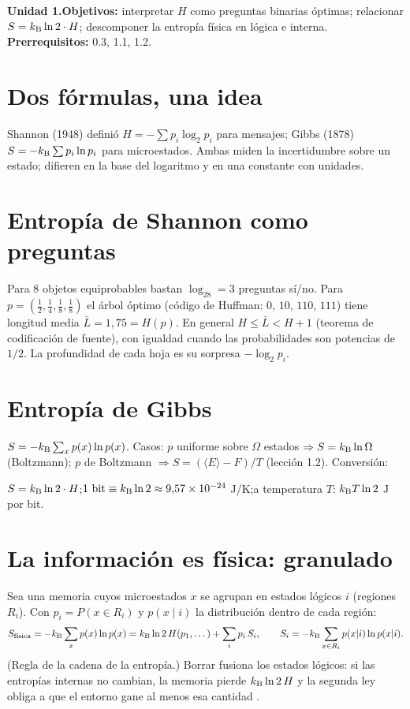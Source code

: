\documentclass[11pt,a4paper]{article}
\begin{document}

\noindent\textbf{Unidad 1.}\quad\textbf{Objetivos:} interpretar $H$ como preguntas binarias óptimas; relacionar
$S=k_{\mathrm B}\ln2\cdot H$; descomponer la entropía física en lógica e interna. \textbf{Prerrequisitos:} 0.3, 1.1, 1.2.

\section{Dos fórmulas, una idea}
Shannon (1948) definió $H=-\sum p_i\log_2p_i$ para mensajes; Gibbs (1878) $S=-k_{\mathrm B}\sum p_i\ln p_i$ para microestados.
Ambas miden la incertidumbre sobre un estado; difieren en la base del logaritmo y en una constante con unidades.

\section{Entropía de Shannon como preguntas}
Para 8 objetos equiprobables bastan $\log_28=3$ preguntas sí/no. Para $p=(\frac12,\frac14,\frac18,\frac18)$ el árbol
óptimo (código de Huffman: $0$, $10$, $110$, $111$) tiene longitud media $\bar L=1{,}75=H(p)$. En general
$H\le\bar L<H+1$ (teorema de codificación de fuente), con igualdad cuando las probabilidades son potencias de $1/2$.
La profundidad de cada hoja es su sorpresa $-\log_2p_i$.

\section{Entropía de Gibbs}
$S=-k_{\mathrm B}\sum_xp(x)\ln p(x)$. Casos: $p$ uniforme sobre $\Omega$ estados $\Rightarrow S=k_{\mathrm B}\ln\Omega$ (Boltzmann);
$p$ de Boltzmann $\Rightarrow S=(\langle E\rangle-F)/T$ (lección 1.2). Conversión:
\begin{resultado}
$S=k_{\mathrm B}\ln2\cdot H$;\quad $1\ \text{bit}\equiv\kB\ln2\approx9{,}57\times10^{-24}$ J/K;\quad a temperatura $T$: $k_{\mathrm B} T\ln2$ J por bit.
\end{resultado}

\section{La información es física: granulado}
Sea una memoria cuyos microestados $x$ se agrupan en estados lógicos $i$ (regiones $R_i$). Con $p_i=P(x\in R_i)$ y
$p(x\mid i)$ la distribución dentro de cada región:
\begin{equation}S_{\text{física}}=-k_{\mathrm B}\sum_xp(x)\ln p(x)=k_{\mathrm B}\ln2\,H(p_1,\dots)+\sum_ip_i\,S_i,\qquad S_i=-k_{\mathrm B}\sum_{x\in R_i}p(x|i)\ln p(x|i).\end{equation}
(Regla de la cadena de la entropía.) Borrar fusiona los estados lógicos: si las entropías internas no cambian, la
memoria pierde $k_{\mathrm B}\ln2\,H$ y la segunda ley obliga a que el entorno gane al menos esa cantidad \cite{bennett,wolpert}.
\end{document}
